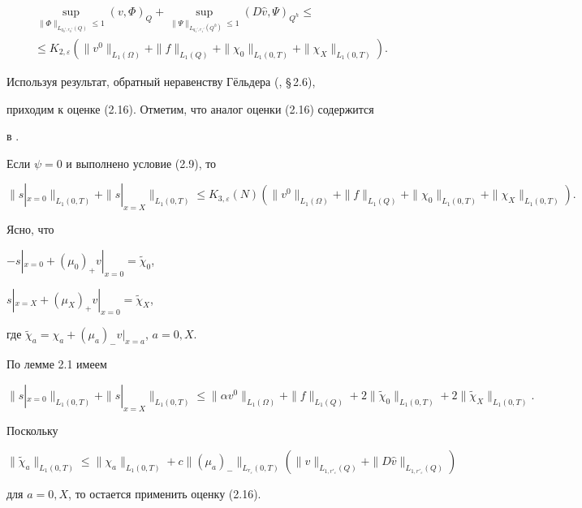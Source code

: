 \documentclass[12pt]{article}
\theoremstyle{plain} %
\theoremstyle{definition}
\newtheorem{corm}{\hskip\parindent Следствие}[section]
\numberwithin{equation}{section}
\begin{document}
\begin{pf}
\begin{multline*}
\sup_{\|\Phi\|_{L_{q_0',r_0'}(Q)}\le 1}(v,\Phi)_Q+


\sup_{\|\Psi\|_{L_{q_1',r_1'}(Q^h)}\le 1}


(D\widehat v,\Psi)_{Q^h}\le\\


%


\le K_{2,\varepsilon}(\|v^0\|_{L_1(\Omega)}+\|f\|_{L_1(Q)}+


\|\chi_0\|_{L_1(0,T)}+\|\chi_X\|_{L_1(0,T)}).


\end{multline*}


Используя результат, обратный неравенству Г\"ельдера (\cite{Be}, \S\,2.6),


приходим к оценке (2.16). Отметим, что аналог оценки (2.16) содержится


в \cite{Amo6}.


\end{pf}





\begin{corm} Если $\psi=0$ и выполнено условие (2.9), то


$$


\|s|_{x=0}\|_{L_1(0,T)}+\|s|_{x=X}\|_{L_1(0,T)}\le


K_{3,\varepsilon}(N)


(\|v^0\|_{L_1(\Omega)}+\|f\|_{L_1(Q)}+\|\chi_0\|_{L_1(0,T)}+


\|\chi_X\|_{L_1(0,T)}).


$$


\end{corm}





\begin{pf} Ясно, что


$-s|_{x=0}+(\mu_0)_+v|_{x=0}=\widetilde\chi_0$,


$s|_{x=X}+(\mu_X)_+v|_{x=0}=\widetilde\chi_X$,


где $\widetilde\chi_a = \chi_a+(\mu_a)_-v|_{x=a}$, $a=0,X$.


По лемме 2.1 имеем


$$


\|s|_{x=0}\|_{L_1(0,T)}+\|s|_{x=X}\|_{L_1(0,T)}


\le\|\alpha v^0\|_{L_1(\Omega)}+\|f\|_{L_1(Q)}+


2\|\widetilde\chi_0\|_{L_1(0,T)}+2\|\widetilde\chi_X\|_{L_1(0,T)}.


$$


Поскольку


$$


\|\widetilde\chi_a\|_{L_1(0,T)}\le \|\chi_a\|_{L_1(0,T)} +


c\|(\mu_a)_-\|_{L_{r_\varepsilon}(0,T)}


(\|v\|_{L_{1,r'_\varepsilon}(Q)}+\|D\widehat v\|_{L_{1,r'_\varepsilon}(Q)})


$$


для $a=0,X$, то остается применить оценку (2.16).


\end{pf}
\end{document}
